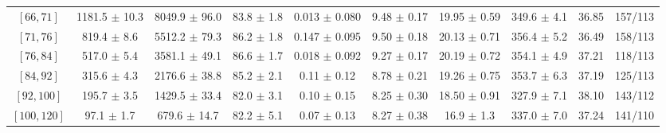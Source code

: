 \begin{tabular}{c||c|c|c|c|c|c|c||c|c}
$[66, 71]$ & 1181.5 $\pm$ 10.3 & 8049.9 $\pm$ 96.0 & 83.8 $\pm$ 1.8 & 0.013 $\pm$ 0.080 & 9.48 $\pm$ 0.17 & 19.95 $\pm$ 0.59 & 349.6 $\pm$ 4.1 & 36.85 & 157/113\\
$[71, 76]$ & 819.4 $\pm$ 8.6 & 5512.2 $\pm$ 79.3 & 86.2 $\pm$ 1.8 & 0.147 $\pm$ 0.095 & 9.50 $\pm$ 0.18 & 20.13 $\pm$ 0.71 & 356.4 $\pm$ 5.2 & 36.49 & 158/113\\
$[76, 84]$ & 517.0 $\pm$ 5.4 & 3581.1 $\pm$ 49.1 & 86.6 $\pm$ 1.7 & 0.018 $\pm$ 0.092 & 9.27 $\pm$ 0.17 & 20.19 $\pm$ 0.72 & 354.1 $\pm$ 4.9 & 37.21 & 118/113\\
$[84, 92]$ & 315.6 $\pm$ 4.3 & 2176.6 $\pm$ 38.8 & 85.2 $\pm$ 2.1 & 0.11 $\pm$ 0.12 & 8.78 $\pm$ 0.21 & 19.26 $\pm$ 0.75 & 353.7 $\pm$ 6.3 & 37.19 & 125/113\\
$[92, 100]$ & 195.7 $\pm$ 3.5 & 1429.5 $\pm$ 33.4 & 82.0 $\pm$ 3.1 & 0.10 $\pm$ 0.15 & 8.25 $\pm$ 0.30 & 18.50 $\pm$ 0.91 & 327.9 $\pm$ 7.1 & 38.10 & 143/112\\
$[100, 120]$ & 97.1 $\pm$ 1.7 & 679.6 $\pm$ 14.7 & 82.2 $\pm$ 5.1 & 0.07 $\pm$ 0.13 & 8.27 $\pm$ 0.38 & 16.9 $\pm$ 1.3 & 337.0 $\pm$ 7.0 & 37.24 & 141/110\\
\end{tabular}
